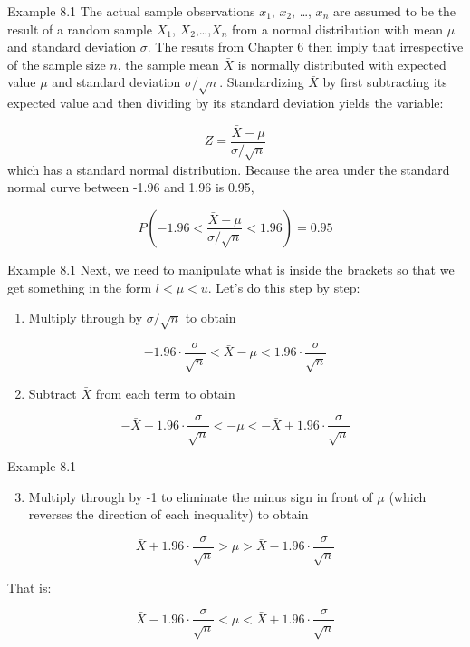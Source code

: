 \documentclass[
  ignorenonframetext,
]{beamer}
\providecommand{\tightlist}{%
  \setlength{\itemsep}{0pt}\setlength{\parskip}{0pt}}\usepackage{longtable,booktabs,array}
\begin{document}
\begin{frame}{Example 8.1}
\protect\hypertarget{example-8.1-1}{}
The actual sample observations \(x_{1}\), \(x_{2}\), \ldots, \(x_{n}\)
are assumed to be the result of a random sample \(X_{1}\),
\(X_{2}\),\ldots,\(X_{n}\) from a normal distribution with mean \(\mu\)
and standard deviation \(\sigma\). The resuts from Chapter 6 then imply
that irrespective of the sample size \(n\), the sample mean \(\bar{X}\)
is normally distributed with expected value \(\mu\) and standard
deviation \(\sigma/\sqrt{n}\). Standardizing \(\bar{X}\) by first
subtracting its expected value and then dividing by its standard
deviation yields the variable:

\[
Z = \frac{\bar{X} - \mu}{\sigma/\sqrt{n}}
\] which has a standard normal distribution. Because the area under the
standard normal curve between -1.96 and 1.96 is 0.95,

\[
P\left(-1.96 < \frac{\bar{X} - \mu}{\sigma/\sqrt{n}} < 1.96\right) = 0.95
\]
\end{frame}

\begin{frame}{Example 8.1}
\protect\hypertarget{example-8.1-2}{}
Next, we need to manipulate what is inside the brackets so that we get
something in the form \(l < \mu < u\). Let's do this step by step:

\begin{enumerate}[<+->]
\tightlist
\item
  Multiply through by \(\sigma/\sqrt{n}\) to obtain
\end{enumerate}

\[
-1.96 \cdot \frac{\sigma}{\sqrt{n}} < \bar{X} - \mu < 1.96 \cdot \frac{\sigma}{\sqrt{n}}
\]

\begin{enumerate}[<+->]
\setcounter{enumi}{1}
\tightlist
\item
  Subtract \(\bar{X}\) from each term to obtain
\end{enumerate}

\[
-\bar{X} -1.96 \cdot \frac{\sigma}{\sqrt{n}} < - \mu < -\bar{X} + 1.96 \cdot \frac{\sigma}{\sqrt{n}}
\]
\end{frame}

\begin{frame}{Example 8.1}
\protect\hypertarget{example-8.1-3}{}
\begin{enumerate}[<+->]
\setcounter{enumi}{2}
\tightlist
\item
  Multiply through by -1 to eliminate the minus sign in front of \(\mu\)
  (which reverses the direction of each inequality) to obtain
\end{enumerate}

\[
\bar{X} + 1.96 \cdot \frac{\sigma}{\sqrt{n}} >  \mu > \bar{X} - 1.96 \cdot \frac{\sigma}{\sqrt{n}}
\]

That is:

\[
\bar{X} - 1.96 \cdot \frac{\sigma}{\sqrt{n}} <  \mu < \bar{X} + 1.96 \cdot \frac{\sigma}{\sqrt{n}}
\]
\end{frame}
\end{document}
